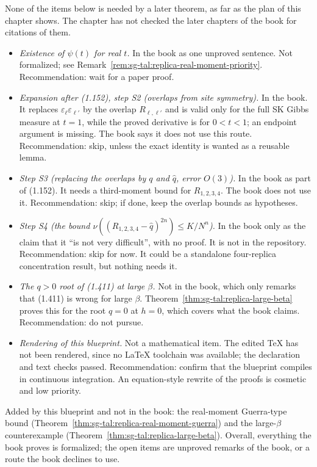 \begin{remark}\label{rem:sg-tal:notes-comments-priorities}
None of the items below is needed by a later theorem, as far as the plan of this chapter shows. The
chapter has not checked the later chapters of the book for citations of them.
\begin{itemize}
\item \emph{Existence of $\psi(t)$ for real $t$.} In the book as one unproved sentence. Not formalized; see
Remark~\ref{rem:sg-tal:replica-real-moment-priority}. Recommendation: wait for a paper proof.
\item \emph{Expansion after (1.152), step S2 (overlaps from site symmetry).} In the book. It replaces
$\varepsilon_\ell\varepsilon_{\ell'}$ by the overlap $R_{\ell,\ell'}$ and is valid only for the full SK Gibbs
measure at $t=1$, while the proved derivative is for $0<t<1$; an endpoint argument is missing. The book says
it does not use this route. Recommendation: skip, unless the exact identity is wanted as a reusable lemma.
\item \emph{Step S3 (replacing the overlaps by $q$ and $\hat q$, error $O(3)$).} In the book as part of
(1.152). It needs a third-moment bound for $R_{1,2,3,4}$. The book does not use it. Recommendation: skip;
if done, keep the overlap bounds as hypotheses.
\item \emph{Step S4 (the bound $\nu((R_{1,2,3,4}-\hat q)^{2n})\le K/N^n$).} In the book only as the claim that
it ``is not very difficult'', with no proof. It is not in the repository. Recommendation: skip for now. It
could be a standalone four-replica concentration result, but nothing needs it.
\item \emph{The $q>0$ root of (1.411) at large $\beta$.} Not in the book, which only remarks that (1.411) is
wrong for large $\beta$. Theorem~\ref{thm:sg-tal:replica-large-beta} proves this for the root $q=0$ at $h=0$,
which covers what the book claims. Recommendation: do not pursue.
\item \emph{Rendering of this blueprint.} Not a mathematical item. The edited TeX has not been rendered, since no
LaTeX toolchain was available; the declaration and text checks passed. Recommendation: confirm that the
blueprint compiles in continuous integration. An equation-style rewrite of the proofs is cosmetic and low
priority.
\end{itemize}
Added by this blueprint and not in the book: the real-moment Guerra-type bound
(Theorem~\ref{thm:sg-tal:replica-real-moment-guerra}) and the large-$\beta$ counterexample
(Theorem~\ref{thm:sg-tal:replica-large-beta}). Overall, everything the book proves is formalized; the open
items are unproved remarks of the book, or a route the book declines to use.
\end{remark}
